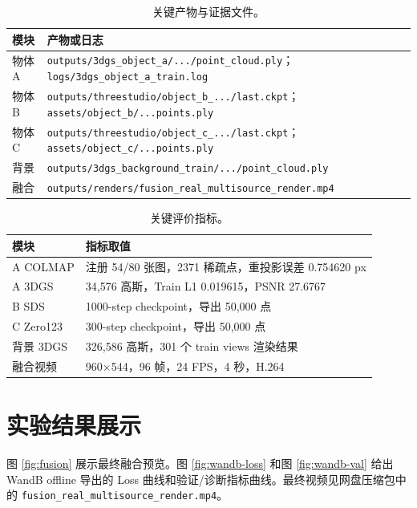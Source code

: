\documentclass[10pt,twocolumn]{ctexart}
\begin{document}
\begin{table}[H]
  \centering
  \caption{关键产物与证据文件。}
  \label{tab:artifacts}
  \scriptsize
  \begin{tabularx}{\columnwidth}{@{}l X@{}}
    \toprule
    模块 & 产物或日志 \\
    \midrule
    物体 A & \texttt{outputs/3dgs\_object\_a/.../point\_cloud.ply}；\texttt{logs/3dgs\_object\_a\_train.log} \\
    物体 B & \texttt{outputs/threestudio/object\_b\_.../last.ckpt}；\texttt{assets/object\_b/...points.ply} \\
    物体 C & \texttt{outputs/threestudio/object\_c\_.../last.ckpt}；\texttt{assets/object\_c/...points.ply} \\
    背景 & \texttt{outputs/3dgs\_background\_train/.../point\_cloud.ply} \\
    融合 & \texttt{outputs/renders/fusion\_real\_multisource\_render.mp4} \\
    \bottomrule
  \end{tabularx}
\end{table}

\begin{table}[H]
  \centering
  \caption{关键评价指标。}
  \label{tab:metrics}
  \small
  \begin{tabularx}{\columnwidth}{@{}l X@{}}
    \toprule
    模块 & 指标取值 \\
    \midrule
    A COLMAP & 注册 54/80 张图，2371 稀疏点，重投影误差 0.754620 px \\
    A 3DGS & 34,576 高斯，Train L1 0.019615，PSNR 27.6767 \\
    B SDS & 1000-step checkpoint，导出 50,000 点 \\
    C Zero123 & 300-step checkpoint，导出 50,000 点 \\
    背景 3DGS & 326,586 高斯，301 个 train views 渲染结果 \\
    融合视频 & 960$\times$544，96 帧，24 FPS，4 秒，H.264 \\
    \bottomrule
  \end{tabularx}
\end{table}

\section{实验结果展示}
图 \ref{fig:fusion} 展示最终融合预览。图 \ref{fig:wandb-loss} 和图 \ref{fig:wandb-val} 给出 WandB offline 导出的 Loss 曲线和验证/诊断指标曲线。最终视频见网盘压缩包中的 \texttt{fusion\_real\_multisource\_render.mp4}。
\end{document}
